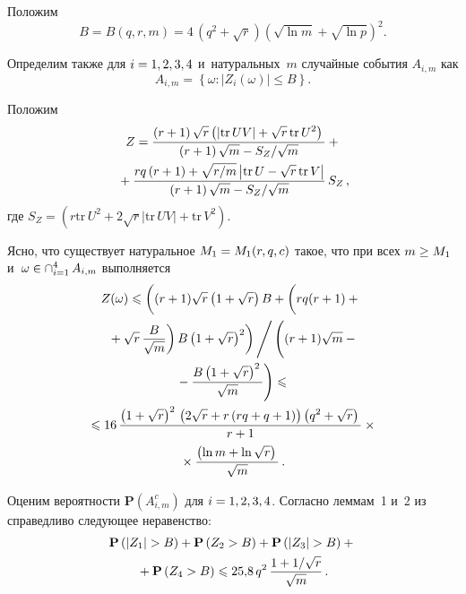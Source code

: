 \begin{multicols}{2}
\pagebreak


Положим
\begin{equation*}
    B = B(q, r, m) = 4\,\left(q^2 + \sqrt{r}\right)\left(\sqrt{\ln m} + \sqrt{\ln p}\right)^2.
\end{equation*}

Определим также для $i \hm= 1, 2, 3, 4$ и~натуральных~$m$ случайные события $A_{i, m}$ 
как 
$$
A_{i, m} = \left\{\omega : |Z_i(\omega)|\leqslant B \right\}.
$$

Положим
\begin{multline*}
Z =
   \vphantom{\fr{\left|\mathrm{tr}\,{U}-\sqrt{r}\,\mathrm{tr}\,{V}\right|}{\sqrt{m}}}
  \fr{\left(r+1\right)\sqrt{r}\left(\left|\mathrm{tr}\,{UV}\right|+\sqrt{r}\,\mathrm{tr}\,{U^{2}}\right)}
  {\left(r+1\right)\sqrt{m}-{S_{Z}}/{\sqrt{m}}}+{}\\
  {}+
\fr{
          rq\left(r+1\right)+\sqrt{r/m}\,{\left|\mathrm{tr}\,{U}-\sqrt{r}\,\mathrm{tr}\,{V}\right|}
}{\left(r+1\right)\sqrt{m}-{S_{Z}}/{\sqrt{m}}}\,
S_{Z}\,,
\end{multline*}
где $S_{Z}=\left(r\mathrm{tr}\,{U^{2}}+2\sqrt{r}\left|\mathrm{tr}\,{UV}\right|+\mathrm{tr}\,{V^{2}}\right).$

Ясно, что существует натуральное $M_1 \hm= M_1(r, q, c)$ такое, что при всех $m\hm\geq 
M_1$ и~$\omega \hm\in \mathop{\cap}\nolimits_{i=1}^4 A_{i, m}$ выполняется
\begin{multline}
\label{ineq_Z}
Z(\omega) \leqslant
\left(
(r+1)\sqrt{r}\left(1+\sqrt{r}\right)B+
    \left(
    \vphantom{\fr{B}{\sqrt{m}}}
    rq(r+1)+{}\right.\right.\\
\left.\left.    {}+\sqrt{r}\,\fr{B}{\sqrt{m}}\right)B\left(1+\sqrt{r}\right)^{2}\right)\Bigg/
\left( 
\vphantom{\fr{B\left(1+\sqrt{r}\right)^{2}}{\sqrt{m}}}
(r+1)\sqrt{m}-{}\right.\\
\left.{}-\fr{B\left(1+\sqrt{r}\right)^{2}}{\sqrt{m}}\right)
\leqslant{}\\
{}\leqslant 
16\,\fr{\left(1+\sqrt{r}\right)^{2}\,\left(2\sqrt{r}+r\,(rq+q+1)\right)
\left(q^2+\sqrt{r}\right)}{r+1}\times{}\\
{}\times \fr{\left(\ln m + \ln\sqrt{r}\right)}{\sqrt{m}}\,.
\end{multline}

Оценим вероятности $\mathbf{P}(A_{i, m}^c)$ для $i \hm= 1, 2, 3, 4$. Согласно 
леммам~1 и~2 из~\cite{lit:LU02} справедливо сле\-ду\-ющее неравенство:
\begin{multline}
    \label{L-1, f-la}
\mathbf{P}\left(|Z_1| > B\right) + \mathbf{P}\left(Z_2 > B\right) +
 \mathbf{P}\left(|Z_3| > B\right) + {}\\
 {}+
\mathbf{P}\left(Z_4 > B\right) \leqslant 25{,}8\,q^2\,\displaystyle\frac{\displaystyle 1+1/\sqrt{r}\mathstrut}{\displaystyle \sqrt{m}\mathstrut}\,.
\end{multline}


\end{multicols}
